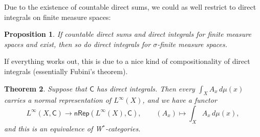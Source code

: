 \documentclass[reqno,T1]{amsproc}
\newcommand{\cat}[1]{\mathsf{#1}}		%
\newcommand{\NRep}[1]{\mathsf{nRep}(#1)}	%
\theoremstyle{plain}
\newtheorem{thm}{Theorem}[section]
\newtheorem{prop}[thm]{Proposition}
\theoremstyle{remark}
\numberwithin{equation}{section}
\begin{document}
Due to the existence of countable direct sums, we could as well restrict to direct integrals on finite measure spaces:

\begin{prop}
If countable direct sums and direct integrals for finite measure spaces and exist, then so do direct integrals for $\sigma$-finite measure spaces.
\end{prop}

If everything works out, this is due to a nice kind of compositionality of direct integrals (essentially Fubini's theorem).


\begin{thm}
Suppose that $\cat{C}$ has direct integrals. Then every $\int_X A_x \, d\mu(x)$ carries a normal representation of $L^\infty(X)$, and we have a functor
\[
	L^\infty(X,\cat{C}) \to \NRep{L^\infty(X),\cat{C}} , \qquad (A_x) \mapsto \int_X A_x \, d\mu(x),
\]
and this is an equivalence of W$^*$-categories.
\end{thm}




\end{document}
